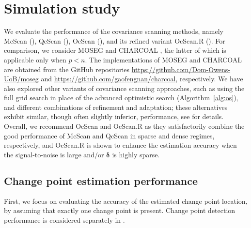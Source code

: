\documentclass[11pt, a4paper]{article}
\theoremstyle{definition}
\theoremstyle{definition}
\theoremstyle{definition}
\theoremstyle{definition}
\theoremstyle{definition}
\theoremstyle{remark}
\theoremstyle{definition}
\theoremstyle{definition}
\theoremstyle{definition}
\begin{document}
\section{Simulation study}
\label{sec:sim}

We evaluate the performance of the covariance scanning methods, namely {McScan} (), {QcScan} (), {OcScan} (), and its refined variant OcScan.R (). For comparison, we consider {MOSEG} \citep{cho2022high} and {CHARCOAL} \citep{gao2022sparse}, the latter of which is applicable only when $p < n$. {The implementations of MOSEG and CHARCOAL are obtained from the GitHub repositories \url{https://github.com/Dom-Owens-UoB/moseg} and \url{https://github.com/gaofengnan/charcoal}, respectively.} We have also explored other variants of covariance scanning approaches, such as using the full grid search in place of the advanced optimistic search (Algorithm~\ref{alg:os}), and different combinations of refinement and adaptation; these alternatives exhibit similar, though often slightly inferior, performance, see  for details. 
Overall, we recommend OcScan and OcScan.R as they satisfactorily combine the good performance of McScan and QcScan in sparse and dense regimes, respectively, and OcScan.R is shown to enhance the estimation accuracy when the signal-to-noise is large and/or $\bm\delta$ is highly sparse.

{
\subsection{Change point estimation performance}
\label{ss:loc:err}
First, we focus on evaluating the accuracy of the estimated change point location, by assuming that exactly one change point is present. 
Change point detection performance is considered separately in .}
\end{document}
